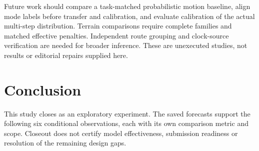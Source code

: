 Future work should compare a task-matched probabilistic motion baseline,
align mode labels before transfer and calibration, and evaluate calibration
of the actual multi-step distribution. Terrain comparisons require complete
families and matched effective penalties. Independent route grouping and
clock-source verification are needed for broader inference. These are
unexecuted studies, not results or editorial repairs supplied here.

\section{Conclusion}
This study closes as an exploratory experiment. The saved forecasts support
the following six conditional observations, each with its own comparison
metric and scope. Closeout does not certify model effectiveness, submission
readiness or resolution of the remaining design gaps.
